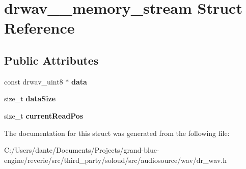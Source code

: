 \hypertarget{structdrwav____memory__stream}{}\section{drwav\+\_\+\+\_\+memory\+\_\+stream Struct Reference}
\label{structdrwav____memory__stream}
\subsection*{Public Attributes}
\begin{DoxyCompactItemize}
\item 
\mbox{\label{structdrwav____memory__stream_a284990f6414466a6d43794ed00a5057c}} 
const drwav\+\_\+uint8 $\ast$ {\bfseries data}
\item 
\mbox{\label{structdrwav____memory__stream_ac9afa4dd398c46e0d690e41c79f1b984}} 
size\+\_\+t {\bfseries data\+Size}
\item 
\mbox{\label{structdrwav____memory__stream_ade61b945505553e8ba4318dfeed2afbe}} 
size\+\_\+t {\bfseries current\+Read\+Pos}
\end{DoxyCompactItemize}


The documentation for this struct was generated from the following file\+:\begin{DoxyCompactItemize}
\item 
C\+:/\+Users/dante/\+Documents/\+Projects/grand-\/blue-\/engine/reverie/src/third\+\_\+party/soloud/src/audiosource/wav/dr\+\_\+wav.\+h\end{DoxyCompactItemize}
